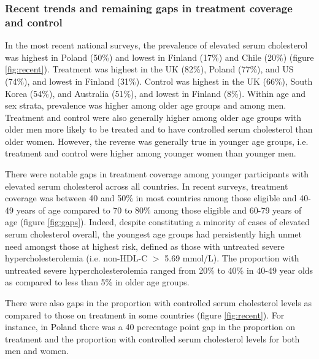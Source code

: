 \documentclass[12pt]{article}
\begin{document}
\begin{refsection}
\subsubsection*{Recent trends and remaining gaps in treatment coverage and control}

In the most recent national surveys, the prevalence of elevated serum cholesterol was highest in Poland (50\%) and lowest in Finland (17\%) and Chile (20\%) (figure \ref{fig:recent}). Treatment was highest in the UK (82\%), Poland (77\%), and US (74\%), and lowest in Finland (31\%). Control was highest in the UK (66\%), South Korea (54\%), and Australia (51\%), and lowest in Finland (8\%). Within age and sex strata, prevalence was higher among older age groups and among men. Treatment and control were also generally higher among older age groups with older men more likely to be treated and to have controlled serum cholesterol than older women. However,  the reverse was generally true in younger age groups, i.e. treatment and control were higher among younger women than younger men. 

There were notable gaps in treatment coverage among younger participants with elevated serum cholesterol across all countries. In recent surveys, treatment coverage was between 40 and 50\% in most countries among those eligible and  40-49 years of age compared to 70 to 80\% among those eligible and 60-79 years of age (figure \ref{fig:gaps}). Indeed, despite constituting a minority of cases of elevated serum cholesterol overall, the youngest age groups had persistently high unmet need amongst those at highest risk, defined as those with untreated severe hypercholesterolemia (i.e. non-HDL-C $>$ 5.69 mmol/L). The proportion with untreated severe hypercholesterolemia ranged from 20\% to 40\% in 40-49 year olds as compared to less than 5\% in older age groups. 

There were also gaps in the proportion with controlled serum cholesterol levels as compared to those on treatment in some countries (figure \ref{fig:recent}). For instance, in Poland there was a 40 percentage point gap in the proportion on treatment and the proportion with controlled serum cholesterol levels for both men and women. 



\end{refsection}
\end{document}
